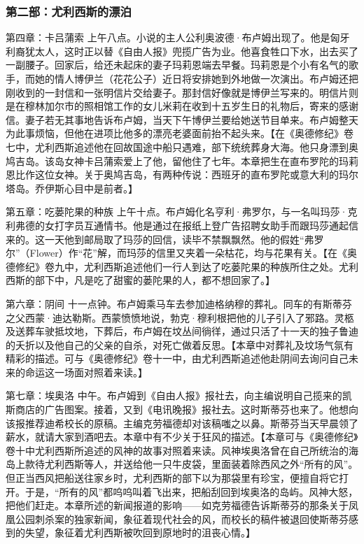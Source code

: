 \subsubsection*{第二部：尤利西斯的漂泊}
\par 第四章：卡吕蒲索 上午八点。小说的主人公利奥波德·布卢姆出现了。他是匈牙利裔犹太人，这时正以替《自由人报》兜揽广告为业。他喜食牲口下水，出去买了一副腰子。回家后，给还未起床的妻子玛莉恩端去早餐。玛莉恩是个小有名气的歌手，而她的情人博伊兰（花花公子）近日将安排她到外地做一次演出。布卢姆还把刚收到的一封信和一张明信片交给妻子。那封信好像就是博伊兰写来的。明信片则是在穆林加尔市的照相馆工作的女儿米莉在收到十五岁生日的礼物后，寄来的感谢信。妻子若无其事地告诉布卢姆，当天下午博伊兰要给她送节目单来。布卢姆整天为此事烦恼，但他在进项比他多的漂亮老婆面前抬不起头来。【在《奥德修纪》卷七中，尤利西斯追述他在回故国途中船只遇难，部下统统葬身大海。他只身漂到奥鸠吉岛。该岛女神卡吕蒲索爱上了他，留他住了七年。本章把生在直布罗陀的玛莉恩比作这位女神。关于奥鸠吉岛，有两种传说：西班牙的直布罗陀或意大利的玛尔塔岛。乔伊斯心目中是前者。】
\par 第五章：吃蒌陀果的种族 上午十点。布卢姆化名亨利·弗罗尔，与一名叫玛莎·克利弗德的女打字员互通情书。他是通过在报纸上登广告招聘女助手而跟玛莎通起信来的。这一天他到邮局取了玛莎的回信，读毕不禁飘飘然。他的假姓“弗罗尔”（Flower）作“花”解，而玛莎的信里又夹着一朵枯花，均与花果有关。【在《奥德修纪》卷九中，尤利西斯追述他们一行人到达了吃蒌陀果的种族所住之处。尤利西斯的部下中，凡是吃了甜蜜的蒌陀果的人，都不想回家了。】
\par 第六章：阴间 十一点钟。布卢姆乘马车去参加迪格纳穆的葬礼。同车的有斯蒂芬之父西蒙·迪达勒斯。西蒙愤愤地说，勃克·穆利根把他的儿子引入了邪路。灵柩及送葬车驶抵坟地，下葬后，布卢姆在坟丛间徜徉，通过只活了十一天的独子鲁迪的夭折以及他自己的父亲的自杀，对死亡做着反思。【本章中对葬礼及坟场气氛有精彩的描述。可与《奥德修纪》卷十一中，由尤利西斯追述他赴阴间去询问自己未来的命运这一场面对照着来读。】
\par 第七章：埃奥洛 中午。布卢姆到《自由人报》报社去，向主编说明自己揽来的凯斯商店的广告图案。接着，又到《电讯晚报》报社去。这时斯蒂芬也来了。他想向该报推荐迪希校长的原稿。主编克劳福德却对该稿嗤之以鼻。斯蒂芬当天早晨领了薪水，就请大家到酒吧去。本章中有不少关于狂风的描述。【本章可与《奥德修纪》卷十中尤利西斯所追述的风神的故事对照着来读。风神埃奥洛曾在自己所统治的海岛上款待尤利西斯等人，并送给他一只牛皮袋，里面装着除西风之外“所有的风”。但正当西风把船送往家乡时，尤利西斯的部下以为那袋里有珍宝，便擅自将它打开。于是，“所有的风”都呜呜叫着飞出来，把船刮回到埃奥洛的岛屿。风神大怒，把他们赶走。本章所述的新闻报道的影响——如克劳福德告诉斯蒂芬的那条关于凤凰公园刺杀案的独家新闻，象征着现代社会的风，而校长的稿件被退回使斯蒂芬感到的失望，象征着尤利西斯被吹回到原地时的沮丧心情。】
